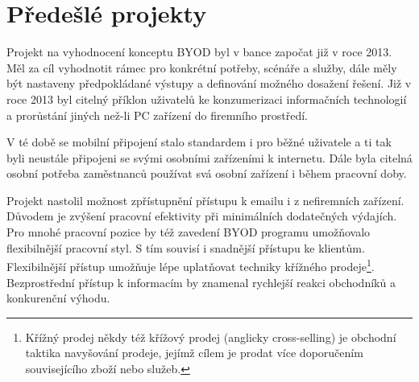 \begin{table}[]

\centering


\caption{Tabulka aktuálního stavu podpory pro jednotlivé typy zařízení podle typu vlastnictví}
\label{tabulka1}

\end{table}


\section{Předešlé projekty}
Projekt na vyhodnocení konceptu BYOD byl v bance započat již v roce 2013. Měl za cíl vyhodnotit rámec pro konkrétní potřeby, scénáře a služby, dále měly být nastaveny předpokládané výstupy a definování možného dosažení řešení. Již v roce 2013 byl citelný příklon uživatelů ke konzumerizaci informačních technologií a prorůstání jiných než-li PC zařízení do firemního prostředí.

V té době se mobilní připojení stalo standardem i pro běžné uživatele a ti tak byli neustále připojeni se svými osobními zařízeními k internetu. Dále byla citelná osobní potřeba zaměstnanců používat svá osobní zařízení i během pracovní doby.

Projekt nastolil možnost zpřístupnění přístupu k emailu i z nefiremních zařízení. Důvodem je zvýšení pracovní efektivity při minimálních dodatečných výdajích. Pro mnohé pracovní pozice by též zavedení BYOD programu umožňovalo flexibilnější pracovní styl. S tím souvisí i snadnější přístupu ke klientům. 
Flexibilnější přístup umožňuje lépe uplatňovat techniky křížného prodeje\footnote{Křížný prodej někdy též křížový prodej (anglicky cross-selling) je obchodní taktika navyšování prodeje, jejímž cílem je prodat více doporučením souvisejícího zboží nebo služeb.}. Bezprostřední přístup k informacím by znamenal rychlejší reakci obchodníků a konkurenční výhodu. 

